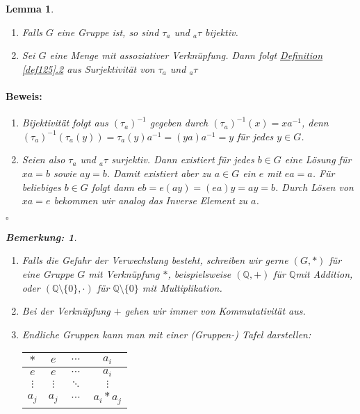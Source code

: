 \documentclass{report}
\newcommand{\Q}{\mathbb{Q}}
\newcommand{\mQ}{$\mathbb{Q}$}
\theoremstyle{customrem}
\newtheorem*{bem}{Bemerkung\textnormal:}
\theoremstyle{customdef}
\newtheorem{lemma}[definition]{Lemma}
\renewenvironment{proof}{\vspace{-.75cm}\paragraph{Beweis: }}{\vspace{-.5cm}\hfill$\square$}
\begin{document}
	\begin{lemma}$ $\vspace{-.75cm}
		\label{lem128}
		\begin{enumerate}
			\item Falls $G$ eine Gruppe ist, so sind $\tau_a$ und $_{a}\tau$ bijektiv.
			\item Sei $G$ eine Menge mit assoziativer Verknüpfung. Dann folgt \hyperref[def125]{Definition \ref{def125}.2} aus Surjektivität von $\tau_a$ und $_{a}\tau$
		\end{enumerate}
		\vspace{.25cm}
		\begin{proof}
			\begin{enumerate}
				\item Bijektivität folgt aus  $(\tau_a)^{-1}$ gegeben durch $(\tau_a)^{-1}(x) = x a^{-1}$, denn $(\tau_a)^{-1}(\tau_a(y)) = \tau_a(y)a^{-1} = (y a) a^{-1} = y$ für jedes $y \in G$.
				\item Seien also $\tau_a$ und $_{a}\tau$ surjektiv. Dann existiert für jedes $b \in G$ eine Lösung für 
				$x a = b$ sowie $a y = b$. 
				Damit existiert aber zu $a \in G$ ein  $e$ mit $ea = a$. Für beliebiges $b \in G$ folgt dann $e b = e (a y) = (e a) y = ay = b$.	Durch Lösen von $x a = e$ bekommen wir analog das Inverse Element zu $a$.
			\end{enumerate}
		\end{proof}
		\vspace{.25cm}
		\begin{bem}$ $
			\begin{enumerate}
				\item Falls die Gefahr der Verwechslung besteht, schreiben wir gerne $(G, \ast)$ für eine Gruppe $G$ mit Verknüpfung $\ast$, 
					beispielsweise $(\Q, +)$ für \mQ mit Addition, oder $(\Q \setminus \{0\}, \cdot)$ für $\Q \setminus \{0\}$ mit Multiplikation.
				\item Bei der Verknüpfung $+$ gehen wir immer von Kommutativität aus.
				\item Endliche Gruppen kann man mit einer (Gruppen-) Tafel darstellen:
				\begin{center}
					\begin{tabular}{c || c  c  c}
						$\ast$   & $e$      & $\cdots$ & $a_i$	    \\\hline\hline
						$e$      & $e$      & $\cdots$	& $a_i$     \\
						$\vdots$ & $\vdots$ & $\ddots$	& $\vdots$  \\
						$a_j$ 	 &$a_j$     & $\cdots$	& $a_i * a_j$

\end{tabular}
\end{center}
\end{enumerate}
\end{bem}
\end{lemma}
\end{document}
